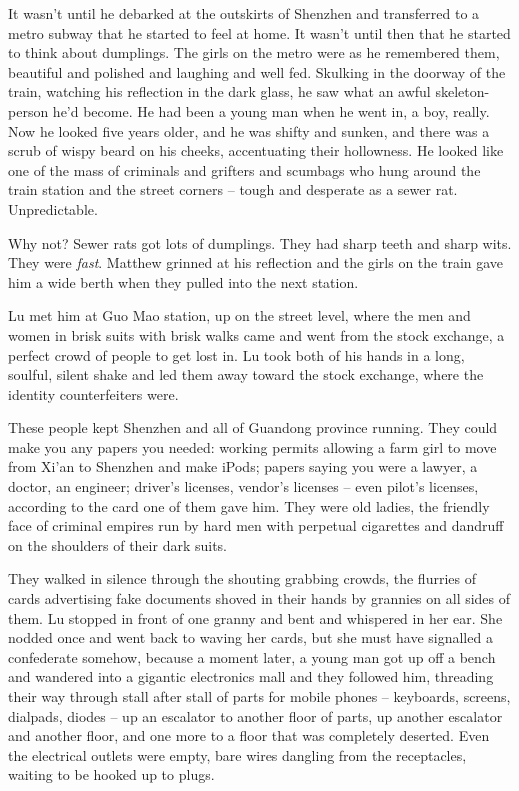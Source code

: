 It wasn't until he debarked at the outskirts of Shenzhen and
transferred to a metro subway that he started to feel at home. It
wasn't until then that he started to think about dumplings. The
girls on the metro were as he remembered them, beautiful and
polished and laughing and well fed. Skulking in the doorway of the
train, watching his reflection in the dark glass, he saw what an
awful skeleton-person he'd become. He had been a young man when he
went in, a boy, really. Now he looked five years older, and he was
shifty and sunken, and there was a scrub of wispy beard on his
cheeks, accentuating their hollowness. He looked like one of the
mass of criminals and grifters and scumbags who hung around the
train station and the street corners -- tough and desperate as a
sewer rat. Unpredictable.

Why not? Sewer rats got lots of dumplings. They had sharp teeth and
sharp wits. They were \emph{fast}. Matthew grinned at his
reflection and the girls on the train gave him a wide berth when
they pulled into the next station.

Lu met him at Guo Mao station, up on the street level, where the
men and women in brisk suits with brisk walks came and went from
the stock exchange, a perfect crowd of people to get lost in. Lu
took both of his hands in a long, soulful, silent shake and led
them away toward the stock exchange, where the identity
counterfeiters were.

These people kept Shenzhen and all of Guandong province running.
They could make you any papers you needed: working permits allowing
a farm girl to move from Xi'an to Shenzhen and make iPods; papers
saying you were a lawyer, a doctor, an engineer; driver's licenses,
vendor's licenses -- even pilot's licenses, according to the card
one of them gave him. They were old ladies, the friendly face of
criminal empires run by hard men with perpetual cigarettes and
dandruff on the shoulders of their dark suits.

They walked in silence through the shouting grabbing crowds, the
flurries of cards advertising fake documents shoved in their hands
by grannies on all sides of them. Lu stopped in front of one granny
and bent and whispered in her ear. She nodded once and went back to
waving her cards, but she must have signalled a confederate
somehow, because a moment later, a young man got up off a bench and
wandered into a gigantic electronics mall and they followed him,
threading their way through stall after stall of parts for mobile
phones -- keyboards, screens, dialpads, diodes -- up an escalator
to another floor of parts, up another escalator and another floor,
and one more to a floor that was completely deserted. Even the
electrical outlets were empty, bare wires dangling from the
receptacles, waiting to be hooked up to plugs.

